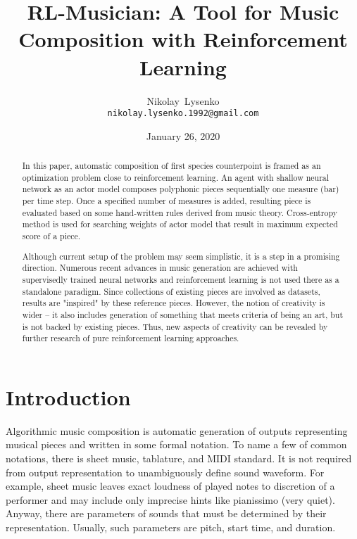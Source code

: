\documentclass{article}
\title{RL-Musician: A Tool for Music Composition with Reinforcement Learning}
\date{January 26, 2020}
\author{
  Nikolay~Lysenko\\
  \texttt{nikolay.lysenko.1992@gmail.com} \\
}
\begin{document}
\maketitle

\begin{abstract}
In this paper, automatic composition of first species counterpoint is framed as an optimization problem close to reinforcement learning. An agent with shallow neural network as an actor model composes polyphonic pieces sequentially one measure (bar) per time step. Once a specified number of measures is added, resulting piece is evaluated based on some hand-written rules derived from music theory. Cross-entropy method is used for searching weights of actor model that result in maximum expected score of a piece.

Although current setup of the problem may seem simplistic, it is a step in a promising direction. Numerous recent advances in music generation are achieved with supervisedly trained neural networks and reinforcement learning is not used there as a standalone paradigm. Since collections of existing pieces are involved as datasets, results are "inspired" by these reference pieces. However, the notion of creativity is wider -- it also includes generation of something that meets criteria of being an art, but is not backed by existing pieces. Thus, new aspects of creativity can be revealed by further research of pure reinforcement learning approaches.
\end{abstract}



\section{Introduction}
\label{sec:introduction}

Algorithmic music composition is automatic generation of outputs representing musical pieces and written in some formal notation. To name a few of common notations, there is sheet music, tablature, and MIDI standard. It is not required from output representation to unambiguously define sound waveform. For example, sheet music leaves exact loudness of played notes to discretion of a performer and may include only imprecise hints like pianissimo (very quiet). Anyway, there are parameters of sounds that must be determined by their representation. Usually, such parameters are pitch, start time, and duration.
\end{document}
